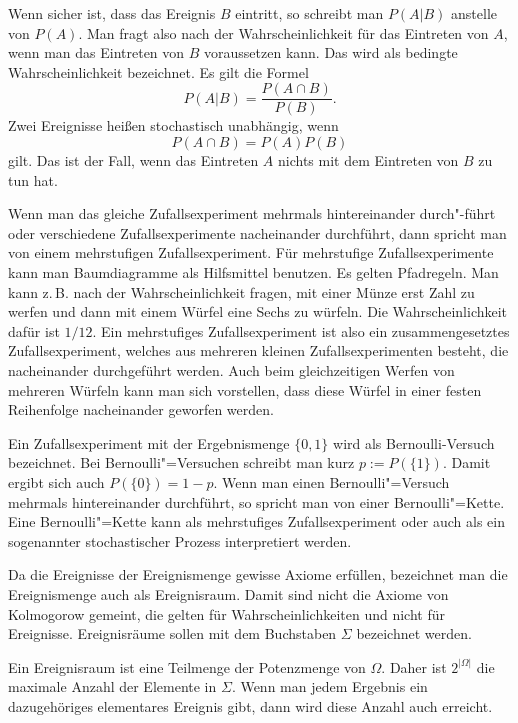 \documentclass[a4paper,11pt,fleqn,twocolumn,twoside]{scrartcl}
\numberwithin{equation}{section}
\begin{document}
Wenn sicher ist, dass das Ereignis $B$ eintritt, so schreibt
man $P(A|B)$ anstelle von $P(A)$. Man fragt also nach der
Wahrscheinlichkeit für das Eintreten von $A$, wenn man das Eintreten
von $B$ voraussetzen kann. Das wird als bedingte Wahrscheinlichkeit
bezeichnet. Es gilt die Formel
\begin{equation}
P(A|B) = \frac{P(A\cap B)}{P(B)}.
\end{equation}
Zwei Ereignisse heißen stochastisch unabhängig, wenn
\begin{equation}
P(A\cap B) = P(A)P(B)
\end{equation}
gilt. Das ist der Fall, wenn das Eintreten $A$ nichts mit dem
Eintreten von $B$ zu tun hat.

Wenn man das gleiche Zufallsexperiment mehrmals hintereinander
durch"-führt oder verschiedene Zufallsexperimente nacheinander
durchführt, dann spricht man von einem mehrstufigen
Zufallsexperiment. Für mehrstufige Zufallsexperimente kann man
Baumdiagramme als Hilfsmittel benutzen. Es gelten Pfadregeln.
Man kann z.\,B. nach der Wahrscheinlichkeit fragen, mit einer Münze
erst Zahl zu werfen und dann mit einem Würfel eine Sechs zu würfeln.
Die Wahrscheinlichkeit dafür ist $1/12$. Ein mehrstufiges
Zufallsexperiment ist also ein zusammengesetztes Zufallsexperiment,
welches aus mehreren kleinen Zufallsexperimenten besteht, die
nacheinander durchgeführt werden. Auch beim gleichzeitigen Werfen
von mehreren Würfeln kann man sich vorstellen, dass diese Würfel
in einer festen Reihenfolge nacheinander geworfen werden.

Ein Zufallsexperiment mit der Ergebnismenge $\{0,1\}$ wird als
Bernoulli-Versuch bezeichnet. Bei Bernoulli"=Versuchen schreibt man
kurz $p:=P(\{1\})$. Damit ergibt sich auch $P(\{0\})=1-p$.
Wenn man einen Bernoulli"=Versuch mehrmals hintereinander durchführt,
so spricht man von einer Bernoulli"=Kette. Eine Bernoulli"=Kette kann
als mehrstufiges Zufallsexperiment oder auch als ein sogenannter
stochastischer Prozess interpretiert werden.

Da die Ereignisse der Ereignismenge gewisse Axiome erfüllen,
bezeichnet man die Ereignismenge auch als Ereignisraum. Damit
sind nicht die Axiome von Kolmogorow gemeint, die gelten für
Wahrscheinlichkeiten und nicht für Ereignisse. Ereignisräume
sollen mit dem Buchstaben $\Sigma$ bezeichnet werden.

Ein Ereignisraum ist eine Teilmenge der Potenzmenge von $\Omega$.
Daher ist $2^{|\Omega|}$ die maximale Anzahl der Elemente in
$\Sigma$. Wenn man jedem Ergebnis ein dazugehöriges elementares
Ereignis gibt, dann wird diese Anzahl auch erreicht.
\end{document}
